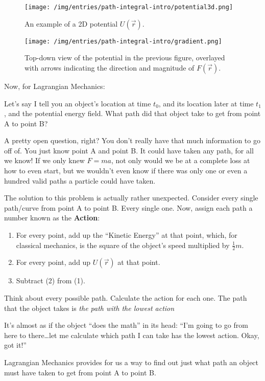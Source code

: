 \documentclass[]{article}
\begin{document}
\begin{figure}
\centering
\texttt{[image: /img/entries/path-integral-intro/potential3d.png]}
\caption{An example of a 2D potential \(U(\vec{r})\).}
\end{figure}

\begin{figure}
\centering
\texttt{[image: /img/entries/path-integral-intro/gradient.png]}
\caption{Top-down view of the potential in the previous figure, overlayed with
arrows indicating the direction and magnitude of \(F(\vec{r})\).}
\end{figure}

Now, for Lagrangian Mechanics:

Let's say I tell you an object's location at time \(t_0\), and its location
later at time \(t_1\), and the potential energy field. What path did that object
take to get from point A to point B?

A pretty open question, right? You don't really have that much information to go
off of. You just know point A and point B. It could have taken any path, for all
we know! If we only knew \(F = m a\), not only would we be at a complete loss at
how to even start, but we wouldn't even know if there was only one or even a
hundred valid paths a particle could have taken.

The solution to this problem is actually rather unexpected. Consider every
single path/curve from point A to point B. Every single one. Now, assign each
path a number known as the \textbf{Action}:

\begin{enumerate}
\def\labelenumi{\arabic{enumi}.}
\tightlist
\item
  For every point, add up the ``Kinetic Energy'' at that point, which, for
  classical mechanics, is the square of the object's speed multiplied by
  \(\frac{1}{2} m\).
\item
  For every point, add up \(U(\vec{r})\) at that point.
\item
  Subtract (2) from (1).
\end{enumerate}

Think about every possible path. Calculate the action for each one. The path
that the object takes is \emph{the path with the lowest action}

It's almost as if the object ``does the math'' in its head: ``I'm going to go
from here to there\ldots let me calculate which path I can take has the lowest
action. Okay, got it!''

Lagrangian Mechanics provides for us a way to find out just what path an object
must have taken to get from point A to point B.
\end{document}
